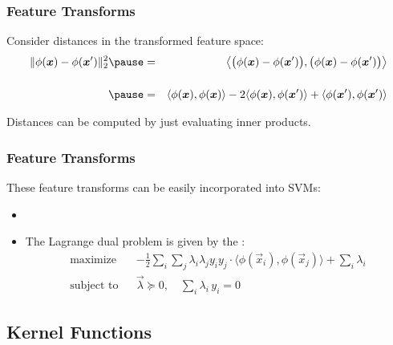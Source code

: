 \begin{frame}
	\frametitle{Feature Transforms \cont}

	Consider distances in the transformed feature space: \\
	\begin{eqnarray*}
		\| \phi(\vec x)-\phi (\vec x')\|_2^2 \pause
		&=& \left\langle \big(\phi(\vec x)-\phi (\vec x')\big), \big(\phi(\vec x)-\phi (\vec x')\big)\right\rangle \\[.5cm] \pause
		&=& \langle \phi(\vec x), \phi(\vec x)\rangle -
		2 \langle \phi(\vec x), \phi(\vec x') \rangle +
		\langle \phi(\vec x'), \phi(\vec x') \rangle
	\end{eqnarray*}
	\pause

	 Distances can be computed by just evaluating inner products.
\end{frame}


\begin{frame}
	\frametitle{Feature Transforms \cont}

	These feature transforms can be easily incorporated into SVMs: \\[.25cm]

	\begin{itemize}
		\item {}
		      \begin{center}
			      \small
		      \end{center}
		      \pause \vspace{.25cm}
		\item The Lagrange dual problem is given by the :
		      {\small
		      \begin{eqnarray*}
			      \mbox{maximize}   & & -\frac{1}{2} \sum_i \sum_j \lambda_i \lambda_j y_i y_j \cdot \langle\phi(\vec x_i),\phi(\vec x_j)\rangle + \sum_i \lambda_i \\[.5cm]
			      \mbox{subject to} & & \vec{\lambda}\succeq 0, \quad \sum_{i} \lambda_i \, y_i = 0
		      \end{eqnarray*}
		      }
	\end{itemize}
\end{frame}


\subsection{Kernel Functions}

